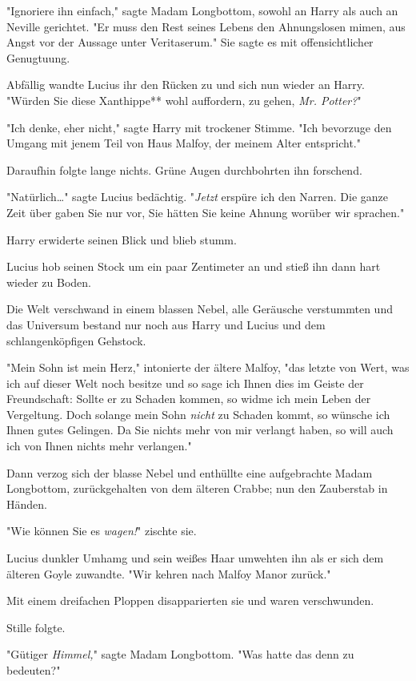 {"Ignoriere ihn einfach," sagte Madam Longbottom, sowohl an Harry als auch an Neville gerichtet. "Er muss den Rest seines Lebens den Ahnungslosen mimen, aus Angst vor der Aussage unter Veritaserum." Sie sagte es mit offensichtlicher Genugtuung.

Abfällig wandte Lucius ihr den Rücken zu und sich nun wieder an Harry. "Würden Sie diese Xanthippe** wohl auffordern, zu gehen, \emph{Mr. Potter?}"

"Ich denke, eher nicht," sagte Harry mit trockener Stimme. "Ich bevorzuge den Umgang mit jenem Teil von Haus Malfoy, der meinem Alter entspricht."

Daraufhin folgte lange nichts. Grüne Augen durchbohrten ihn forschend.

"Natürlich…" sagte Lucius bedächtig. "\emph{Jetzt} erspüre ich den Narren. Die ganze Zeit über gaben Sie nur vor, Sie hätten Sie keine Ahnung worüber wir sprachen."

Harry erwiderte seinen Blick und blieb stumm.

Lucius hob seinen Stock um ein paar Zentimeter an und stieß ihn dann hart wieder zu Boden.

Die Welt verschwand in einem blassen Nebel, alle Geräusche verstummten und das Universum bestand nur noch aus Harry und Lucius und dem schlangenköpfigen Gehstock.

"Mein Sohn ist mein Herz," intonierte der ältere Malfoy, "das letzte von Wert, was ich auf dieser Welt noch besitze und so sage ich Ihnen dies im Geiste der Freundschaft: Sollte er zu Schaden kommen, so widme ich mein Leben der Vergeltung. Doch solange mein Sohn \emph{nicht} zu Schaden kommt, so wünsche ich Ihnen gutes Gelingen. Da Sie nichts mehr von mir verlangt haben, so will auch ich von Ihnen nichts mehr verlangen."

Dann verzog sich der blasse Nebel und enthüllte eine aufgebrachte Madam Longbottom, zurückgehalten von dem älteren Crabbe; nun den Zauberstab in Händen.

"Wie können Sie es \emph{wagen!}" zischte sie.

Lucius dunkler Umhamg und sein weißes Haar umwehten ihn als er sich dem älteren Goyle zuwandte. "Wir kehren nach Malfoy Manor zurück."

Mit einem dreifachen Ploppen disapparierten sie und waren verschwunden.

Stille folgte.

"Gütiger \emph{Himmel,}" sagte Madam Longbottom. "Was hatte das denn zu bedeuten?"

}
